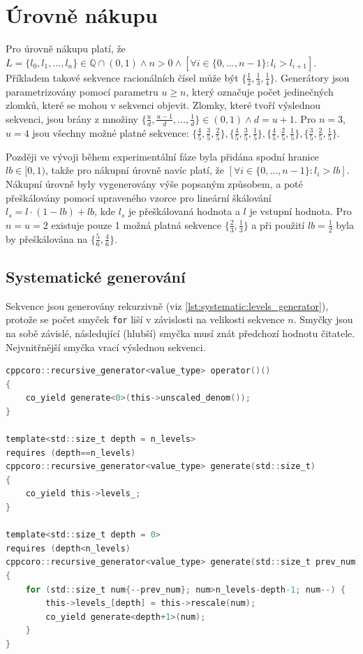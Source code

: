 \section{Úrovně nákupu}
Pro úrovně nákupu platí, že $L=\{l_0, l_1,\dots,l_n\} \in \mathbb{Q} \cap (0, 1) \land n>0 \land [\forall i \in \{0,\dots,n-1\} : l_i > l_{i+1}]$.
Příkladem takové sekvence racionálních čísel může být $\{\frac{1}{2}, \frac{1}{3}, \frac{1}{4}\}$.
Generátory jsou parametrizovány pomocí parametru $u\geq n$, který označuje počet jedinečných zlomků, které se mohou v sekvenci objevit.
Zlomky, které tvoří výslednou sekvenci, jsou brány z množiny $\{\frac{u}{d}, \frac{u-1}{d},\dots, \frac{1}{d}\} \in (0, 1) \land d=u+1$.
Pro $n=3$, $u=4$ jsou všechny možné platné sekvence: $\{\frac{4}{5}, \frac{3}{5}, \frac{2}{5}\}, \{\frac{4}{5}, \frac{3}{5}, \frac{1}{5}\}, \{\frac{4}{5}, \frac{2}{5}, \frac{1}{5}\}, \{\frac{3}{5}, \frac{2}{5}, \frac{1}{5}\}$.

Později ve vývoji během experimentální fáze byla přidána spodní hranice $lb\in[0, 1)$, takže pro nákupní úrovně navíc platí, že $[\forall i \in \{0,\dots,n-1\} : l_i > lb] $.
Nákupní úrovně byly vygenerovány výše popsaným způsobem, a poté přeškálovány pomocí upraveného vzorce pro lineární škálování $l_s=l\cdot(1-lb)+lb$, kde $l_s$ je přeškálovaná hodnota a $l$ je vstupní hodnota.
Pro $n=u=2$ existuje pouze 1 možná platná sekvence $\{\frac{2}{3},\frac{1}{3}\}$ a při použití $lb=\frac{1}{2}$ byla by přeškálována na $\{\frac{5}{6},\frac{4}{6}\}$.


\subsection{Systematické generování}
Sekvence jsou generovány rekurzivně (viz \ref{lst:systematic:levels_generator}), protože se počet smyček \texttt{for} liší v závislosti na velikosti sekvence $n$.
Smyčky jsou na sobě závislé, následující (hlubší) smyčka musí znát předchozí hodnotu čitatele.
Nejvnitřnější smyčka vrací výslednou sekvenci.

\begin{lstlisting}[caption={~Metody pro systematické generování úrovní nákupu},label={lst:systematic:levels_generator},captionpos=t,abovecaptionskip=-\medskipamount,belowcaptionskip=\medskipamount,language=C]
cppcoro::recursive_generator<value_type> operator()()
{
    co_yield generate<0>(this->unscaled_denom());
}

template<std::size_t depth = n_levels>
requires (depth==n_levels)
cppcoro::recursive_generator<value_type> generate(std::size_t)
{
    co_yield this->levels_;
}

template<std::size_t depth = 0>
requires (depth<n_levels)
cppcoro::recursive_generator<value_type> generate(std::size_t prev_num)
{
    for (std::size_t num{--prev_num}; num>n_levels-depth-1; num--) {
        this->levels_[depth] = this->rescale(num);
        co_yield generate<depth+1>(num);
    }
}
\end{lstlisting}

